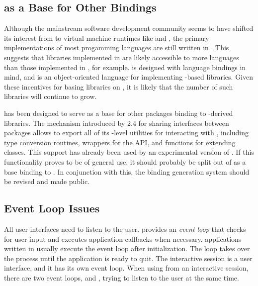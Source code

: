 \documentclass[article]{jss}
\begin{document}
\subsection[RGtk2 as a Base for Other GObject Bindings]{ as a Base for Other  Bindings}

Although the mainstream software development community seems to have
shifted its interest from  to virtual machine runtimes like
 and , the primary implementations of most 
progamming languages are still written in . This suggests that 
libraries implemented in  are likely accessible to more languages than
those implemented in , for example.  is designed
with language bindings in mind, and  is an object-oriented
language for implementing -based libraries.
Given these incentives for basing libraries on , it is likely
that the number of such libraries will continue to grow.

 has been designed to serve as a base for other 
packages binding to -derived libraries. The mechanism introduced
by  2.4 for sharing  interfaces between packages allows
 to export all of its -level utilities for 
interacting with , including type conversion routines, wrappers
for the  API, and functions for extending  classes.
This support has already been used by an experimental version of 
\citep{ggobi-beta}. If this functionality proves to be of general use, 
it should probably be split out of  as a base binding to .
In conjunction with this, the binding generation system should be revised
and made public.

\subsection{Event Loop Issues}

All user interfaces need to listen to the user.  provides an 
\emph{event loop} that checks for user input and executes application callbacks
when necessary.  applications written in  usually execute
the  event loop after initialization. The loop takes over the process
until the application is ready to quit. The interactive  session
is a user interface, and it has its own event loop. When using 
from an interactive session, there are two event loops,  and ,
trying to listen to the user at the same time.
\end{document}
